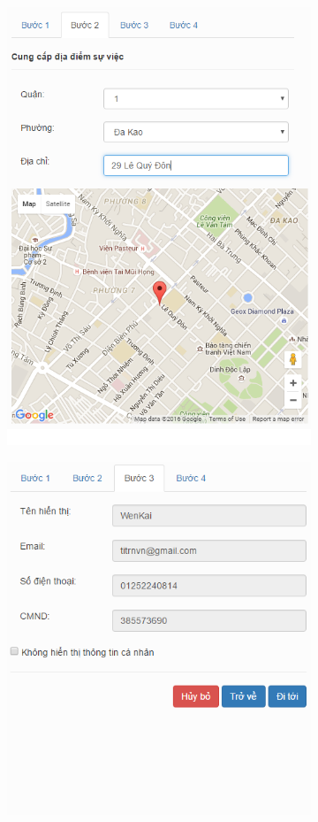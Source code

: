 \documentclass[a4paper]{article}
\begin{document}
\begin{itemize}
\begin{figure}[h]
\begin{subfigure}{.5\textwidth}
  			\centering
  			\includegraphics[width=0.6\linewidth]{Step2.PNG}
  			\caption{}
  			\label{fig:sub2}
		\end{subfigure}
		\begin{subfigure}{.5\textwidth}
  			\centering
  			\includegraphics[width=0.6\linewidth]{Step3.PNG}
  			\caption{}
  			\label{fig:sub2}
		\end{subfigure}%
		\begin{subfigure}{.5\textwidth}
  			\centering

\end{subfigure}
\end{figure}
\end{itemize}
\end{document}
